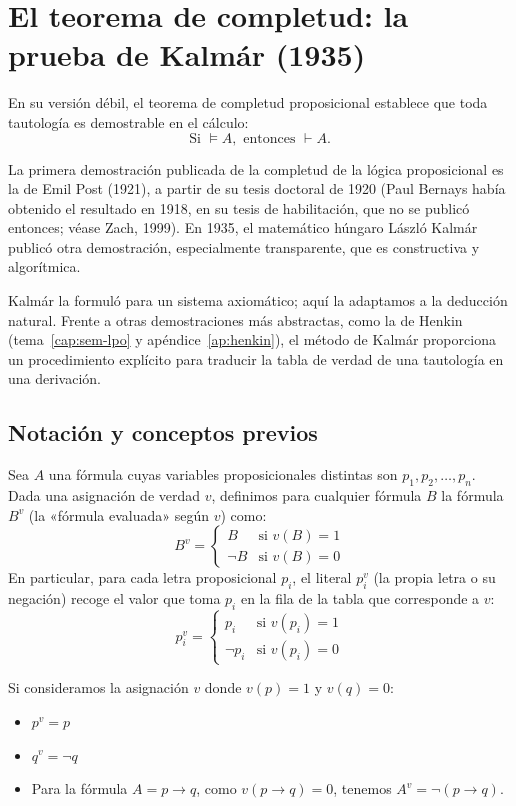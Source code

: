 \section{El teorema de completud: la prueba de Kalmár (1935)}

En su versión débil, el teorema de completud proposicional establece que toda tautología es demostrable en el cálculo:
\[
\text{Si } \models A, \text{ entonces } \vdash A.
\]

La primera demostración publicada de la completud de la lógica proposicional es la de Emil Post (1921), a partir de su tesis doctoral de 1920
(Paul Bernays había obtenido el resultado en 1918, en su tesis de
habilitación, que no se publicó entonces; véase Zach, 1999). En 1935, el matemático húngaro László Kalmár
publicó otra demostración, especialmente transparente, que es
constructiva y algorítmica.

Kalmár la formuló para un sistema axiomático; aquí la adaptamos a la
deducción natural. Frente a otras demostraciones más abstractas, como
la de Henkin (tema~\ref{cap:sem-lpo} y apéndice~\ref{ap:henkin}), el método de Kalmár proporciona un procedimiento explícito para traducir la tabla de verdad de una tautología en una derivación.

\subsection{Notación y conceptos previos}

Sea $A$ una fórmula cuyas variables proposicionales distintas son $p_1, p_2, \dots, p_n$.
Dada una asignación de verdad $v$, definimos para cualquier fórmula $B$ la fórmula $B^v$ (la «fórmula evaluada» según $v$) como:
\[
B^v = \begin{cases}
B & \text{si } v(B) = 1 \\
\neg B & \text{si } v(B) = 0
\end{cases}
\]
En particular, para cada letra proposicional $p_i$, el literal $p_i^v$ (la propia letra o su negación) recoge el valor que toma $p_i$ en la fila de la tabla que corresponde a $v$:
\[
p_i^v = \begin{cases}
p_i & \text{si } v(p_i) = 1 \\
\neg p_i & \text{si } v(p_i) = 0
\end{cases}
\]

\begin{example}
Si consideramos la asignación $v$ donde $v(p) = 1$ y $v(q) = 0$:
\begin{itemize}
    \item $p^v = p$
    \item $q^v = \neg q$
    \item Para la fórmula $A = p \to q$, como $v(p \to q) = 0$, tenemos $A^v = \neg(p \to q)$.
\end{itemize}
\end{example}

